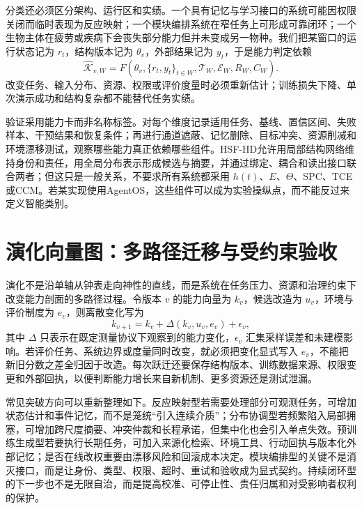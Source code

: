 分类还必须区分架构、运行区和实绩。一个具有记忆与学习接口的系统可能因权限关闭而临时表现为反应映射；一个模块编排系统在窄任务上可形成可靠闭环；一个生物主体在疲劳或疾病下会丧失部分能力但并未变成另一物种。我们把某窗口的运行状态记为 $r_t$，结构版本记为 $\theta_v$，外部结果记为 $y_t$，于是能力判定依赖
\begin{equation}
 \widehat{\mathcal K}_{v,W}=F(\theta_v,\{r_t,y_t\}_{t\in W},\mathcal T_W,\mathcal E_W,R_W,C_W).
\end{equation}
改变任务、输入分布、资源、权限或评价度量时必须重新估计；训练损失下降、单次演示成功和结构复杂都不能替代任务实绩。

验证采用能力卡而非名称标签。对每个维度记录适用任务、基线、置信区间、失败样本、干预结果和恢复条件；再进行通道遮蔽、记忆删除、目标冲突、资源削减和环境漂移测试，观察哪些能力真正依赖哪些组件。HSF-HD允许用局部结构网络维持身份和责任，用全局分布表示形成候选与摘要，并通过绑定、耦合和读出接口联合两者；但这只是一般关系，不要求所有系统都采用 $h(t)$、$E$、$\Theta$、SPC、TCE或CCM。若某实现使用AgentOS，这些组件可以成为实验操纵点，而不能反过来定义智能类别。

\section{演化向量图：多路径迁移与受约束验收}
\label{sec:section_6919}

演化不是沿单轴从钟表走向神性的直线，而是系统在任务压力、资源和治理约束下改变能力剖面的多路径过程。令版本 $v$ 的能力向量为 $k_v$，候选改造为 $u_v$，环境与评价制度为 $e_v$，则离散变化写为
\begin{equation}
 k_{v+1}=k_v+\Delta(k_v,u_v,e_v)+\epsilon_v,
\end{equation}
其中 $\Delta$ 只表示在既定测量协议下观察到的能力变化，$\epsilon_v$ 汇集采样误差和未建模影响。若评价任务、系统边界或度量同时改变，就必须把变化显式写入 $e_v$，不能把新旧分数之差全归因于改造。每次跃迁还要保存结构版本、训练数据来源、权限变更和外部回执，以便判断能力增长来自新机制、更多资源还是测试泄漏。

常见突破方向可以重新整理如下。反应映射型若需要处理部分可观测任务，可增加状态估计和事件记忆，而不是笼统“引入连续介质”；分布协调型若频繁陷入局部拥塞，可增加跨尺度摘要、冲突仲裁和长程承诺，但集中化也会引入单点失效。预训练生成型若要执行长期任务，可加入来源化检索、环境工具、行动回执与版本化外部记忆；是否在线改权重要由漂移风险和回滚成本决定。模块编排型的关键不是消灭接口，而是让身份、类型、权限、超时、重试和验收成为显式契约。持续闭环型的下一步也不是无限自治，而是提高校准、可停止性、责任归属和对受影响者权利的保护。

